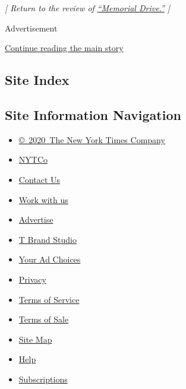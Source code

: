 \emph{{[} Return to the review of}
\href{https://www.nytimes3xbfgragh.onion/2020/07/30/books/review/memorial-drive-natastha-trethewey.html}{\emph{``Memorial
Drive.''}} \emph{{]}}

Advertisement

\protect\hyperlink{after-bottom}{Continue reading the main story}

\hypertarget{site-index}{%
\subsection{Site Index}\label{site-index}}

\hypertarget{site-information-navigation}{%
\subsection{Site Information
Navigation}\label{site-information-navigation}}

\begin{itemize}
\tightlist
\item
  \href{https://help.nytimes3xbfgragh.onion/hc/en-us/articles/115014792127-Copyright-notice}{©~2020~The
  New York Times Company}
\end{itemize}

\begin{itemize}
\tightlist
\item
  \href{https://www.nytco.com/}{NYTCo}
\item
  \href{https://help.nytimes3xbfgragh.onion/hc/en-us/articles/115015385887-Contact-Us}{Contact
  Us}
\item
  \href{https://www.nytco.com/careers/}{Work with us}
\item
  \href{https://nytmediakit.com/}{Advertise}
\item
  \href{http://www.tbrandstudio.com/}{T Brand Studio}
\item
  \href{https://www.nytimes3xbfgragh.onion/privacy/cookie-policy\#how-do-i-manage-trackers}{Your
  Ad Choices}
\item
  \href{https://www.nytimes3xbfgragh.onion/privacy}{Privacy}
\item
  \href{https://help.nytimes3xbfgragh.onion/hc/en-us/articles/115014893428-Terms-of-service}{Terms
  of Service}
\item
  \href{https://help.nytimes3xbfgragh.onion/hc/en-us/articles/115014893968-Terms-of-sale}{Terms
  of Sale}
\item
  \href{https://spiderbites.nytimes3xbfgragh.onion}{Site Map}
\item
  \href{https://help.nytimes3xbfgragh.onion/hc/en-us}{Help}
\item
  \href{https://www.nytimes3xbfgragh.onion/subscription?campaignId=37WXW}{Subscriptions}
\end{itemize}
